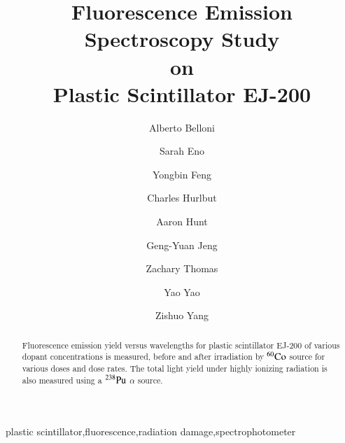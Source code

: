 \documentclass[preprint,12pt]{elsarticle}
\begin{document}
\begin{frontmatter}



\title{Fluorescence Emission Spectroscopy Study\\ on\\ Plastic Scintillator EJ-200}


\author[umd]{Alberto Belloni}
\author[umd]{Sarah Eno}
\author[umd]{Yongbin Feng}
\author[eljen]{Charles Hurlbut}
\author[umd]{Aaron Hunt}
\author[umd]{Geng-Yuan Jeng}
\author[umd]{Zachary Thomas}
\author[umd]{Yao Yao}
\author[umd]{Zishuo Yang}

\address[umd]{Department of Physics, University of Maryland, College Park, MD 20740, USA}
\address[eljen]{Eljen Technology, 1300 W. Broadway, Sweetwater, TX 79556, USA}

\begin{abstract}
Fluorescence emission yield versus wavelengths for plastic scintillator EJ-200 of various dopant concentrations is measured,
 before and after irradiation by $\rm {^{60}Co}$ source for various doses and dose rates. 
The total light yield under highly ionizing radiation is also measured using a $\rm {^{238}Pu}$ $\alpha$ source. 

\end{abstract}

\begin{keyword}
plastic scintillator\sep fluorescence\sep radiation damage\sep spectrophotometer

\end{keyword}

\end{frontmatter}
\end{document}
